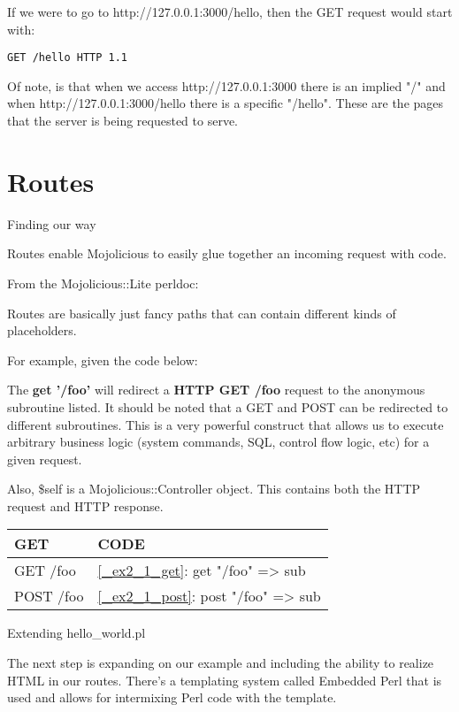 \documentclass[14pt]{extreport}
\newcommand\Small{\fontsize{12}{13.0}\fontencoding{T1}\selectfont}
\newcommand*\LSTfont{\Small\ttfamily\SetTracking{encoding=*}{-60}\lsstyle}
\begin{document}
If we were to go to http://127.0.0.1:3000/hello, then the GET request would
start with:

\begin{lstlisting}[style=BlockStyle]
    GET /hello HTTP 1.1
\end{lstlisting}

Of note, is that when we access http://127.0.0.1:3000 there is an implied "/"
and when http://127.0.0.1:3000/hello there is a specific "/hello".  These are
the pages that the server is being requested to serve.

\section{Routes}

{\Large Finding our way}

Routes enable Mojolicious to easily glue together an incoming request with
code.

From the Mojolicious::Lite perldoc:

Routes are basically just fancy paths that can contain different kinds of
placeholders.

For example, given the code below:



The \textbf{get '/foo'} will redirect a \textbf{HTTP GET /foo} request to the
anonymous subroutine listed. It should be noted that a GET and POST can be
redirected to different subroutines.  This is a very powerful construct that
allows us to execute arbitrary business logic (system commands, SQL, control
flow logic, etc) for a given request.

Also, \$self is a Mojolicious::Controller object.  This contains both the HTTP
request and HTTP response.

\begin{center}
  \begin{tabular}{|l|l|}
    \hline
    GET  & CODE\\
    \hline
    GET /foo & \ref{_ex2_1_get}: get "/foo" => sub {}\\
    POST /foo & \ref{_ex2_1_post}: post "/foo" => sub {}\\
    \hline
  \end{tabular}
\end{center}

{\Large Extending hello\_world.pl}

The next step is expanding on our example and including the ability to realize
HTML in our routes.  There's a templating system called Embedded Perl that is
used and allows for intermixing Perl code with the template.
\end{document}

